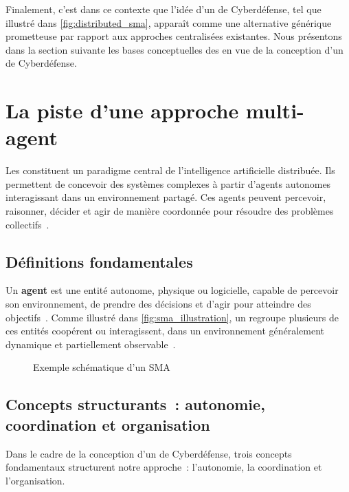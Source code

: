 \noindent
Finalement, c'est dans ce contexte que l'idée d'un  de Cyberdéfense, tel que illustré dans \autoref{fig:distributed_sma}, apparaît comme une alternative générique prometteuse par rapport aux approches centralisées existantes. Nous présentons dans la section suivante les bases conceptuelles des  en vue de la conception d'un  de Cyberdéfense.

\section{La piste d'une approche multi-agent}\label{sec:sma-concepts}

Les  constituent un paradigme central de l'intelligence artificielle distribuée. Ils permettent de concevoir des systèmes complexes à partir d'agents autonomes interagissant dans un environnement partagé. Ces agents peuvent percevoir, raisonner, décider et agir de manière coordonnée pour résoudre des problèmes collectifs~\cite{Ferber1999,Wooldridge2002}.

\subsection*{Définitions fondamentales}

Un \textbf{agent} est une entité autonome, physique ou logicielle, capable de percevoir son environnement, de prendre des décisions et d'agir pour atteindre des objectifs~\cite{Russell2010}. Comme illustré dans \autoref{fig:sma_illustration}, un  regroupe plusieurs de ces entités coopérent ou interagissent, dans un environnement généralement dynamique et partiellement observable~\cite{Jennings1998,Shoham2007}.

\begin{figure}[h]
    \centering
    \resizebox{\textwidth}{!}{%
        
    }
    \caption{Exemple schématique d'un SMA}
    \label{fig:sma_illustration}
\end{figure}

\subsection*{Concepts structurants~: autonomie, coordination et organisation}

Dans le cadre de la conception d'un  de Cyberdéfense, trois concepts fondamentaux structurent notre approche~: l'autonomie, la coordination et l'organisation.

